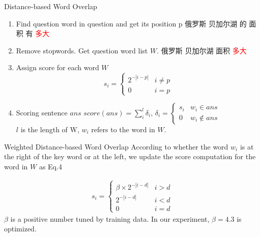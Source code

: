 \documentclass[aspectratio=169]{beamer} %
\begin{document}
  \begin{frame}{Distance-based Word Overlap}
    \begin{enumerate}
      \item Find question word in question and get its position p \newline
      俄罗斯 {} 贝加尔湖 {} 的 {} 面积 {} 有 {} \textcolor{red}{多大} 
      \item Remove stopwords. Get question word list $W$. \newline
      俄罗斯 {} 贝加尔湖 {} 面积 {} \textcolor{red}{多大} \\
       \qquad {}   

      \item Assign score for each word $W$ \newline
        \begin{equation}
          s_i = \begin{cases}2^{-|i-p|} & i \ne p \\ 0 & i = p \end{cases}
        \end{equation}
      \item Scoring sentence $ans$ \newline
        $ score(ans) = \sum_{i}^{l} {\delta}_i $, {}{}{} $ {\delta}_i=\begin{cases}s_i & w_i \in ans  \\ 0 & w_i \notin ans \end{cases} $ \\
        $l$ is the length of W, $w_i$ refers to the word in $W$.
    \end{enumerate}
  \end{frame}

  \begin{frame}{Weighted Distance-based Word Overlap}
    According to whether the word $w_i$ is at the right of the key word or at the left, we update the score computation for the word in $W$ as Eq.4  

      \begin{equation}
      \begin{aligned}
        s_i = \begin{cases} \beta \times 2^{-|i-d|} & i > d \\
         2^{-|i-d|} & i < d \\
         0 & i = d
         \end{cases}
      \end{aligned}
      \end{equation}
    $\beta$ is a positive number tuned by training data. In our experiment, $\beta = 4.3$ is optimized.
  \end{frame}
\end{document}
